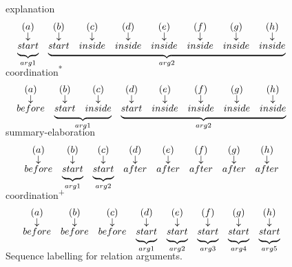 \begin{figure}[ht]
\centering

explanation
\[
\begin{array}{*8{c}}
(a)&(b)&(c)&(d)&(e)&(f)&(g)&(h)\\[-2pt]
\downarrow&\downarrow&\downarrow&\downarrow&\downarrow&\downarrow&\downarrow&\downarrow\\[-2pt]
\undermat{arg1}{start}&\undermat{arg2}{start&inside&inside&inside&inside&inside&inside}
\end{array}
\]
\vspace{1em}

coordination\textsuperscript{*}
\[
\begin{array}{*8{c}}
(a)&(b)&(c)&(d)&(e)&(f)&(g)&(h)\\[-2pt]
\downarrow&\downarrow&\downarrow&\downarrow&\downarrow&\downarrow&\downarrow&\downarrow\\[-2pt]
before&\undermat{arg1}{start&inside}&\undermat{arg2}{start&inside&inside&inside&inside}
\end{array}
\]
\vspace{1em}

summary-elaboration
\[
\begin{array}{*8{c}}
(a)&(b)&(c)&(d)&(e)&(f)&(g)&(h)\\[-2pt]
\downarrow&\downarrow&\downarrow&\downarrow&\downarrow&\downarrow&\downarrow&\downarrow\\[-2pt]
before&\undermat{arg1}{start}&\undermat{arg2}{start}&after&after&after&after&after
\end{array}
\]
\vspace{1em}

coordination\textsuperscript{+}
\[
\begin{array}{*8{c}}
(a)&(b)&(c)&(d)&(e)&(f)&(g)&(h)\\[-2pt]
\downarrow&\downarrow&\downarrow&\downarrow&\downarrow&\downarrow&\downarrow&\downarrow\\[-2pt]
before&before&before&\undermat{arg1}{start}&\undermat{arg2}{start}&\undermat{arg3}{start}&\undermat{arg4}{start}&\undermat{arg5}{start}
\end{array}
\]
\vspace{1em}

\caption{\label{i:rare-args} Sequence labelling for relation arguments. }

\end{figure}
